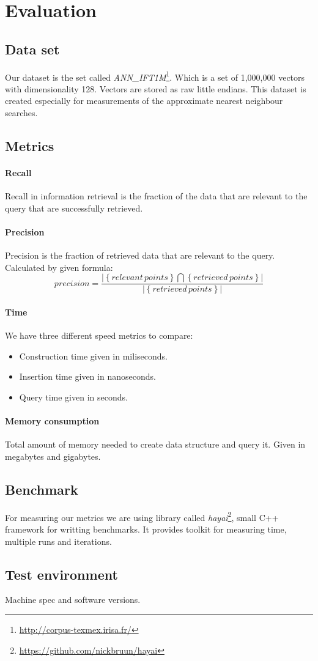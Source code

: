 \section{Evaluation}
 \subsection{Data set}
 Our dataset is the set called \textit{ANN\_IFT1M}\footnote{\url{http://corpus-texmex.irisa.fr/}}. Which is a set of 1,000,000 vectors
 with dimensionality 128. Vectors are stored as raw little endians.
 This dataset is created especially for measurements of the approximate nearest 
neighbour searches.  
 \subsection{Metrics}
 \paragraph{Recall}Recall in information retrieval is the fraction of the data that are relevant to the query that are successfully retrieved.
 \paragraph{Precision}Precision is the fraction of retrieved data that are relevant to the query. Calculated by given formula:
\begin{equation}
        precision = \frac{| \left\lbrace relevant\, points \right\rbrace \bigcap \left\lbrace retrieved\, points \right\rbrace | }{{| \left\lbrace retrieved\, points \right\rbrace |}}
\end{equation}
 \paragraph{Time}We have three different speed metrics to compare:
 \begin{itemize}
  \item Construction time given in miliseconds. 
  \item Insertion time given in nanoseconds.
  \item Query time given in seconds.
\end{itemize}
 \paragraph{Memory consumption} Total amount of memory needed to create data structure and query it. Given in megabytes and gigabytes.
 \subsection{Benchmark} For measuring our metrics we are using library called 
 \textit{hayai}\footnote{\url{https://github.com/nickbruun/hayai}}, small C++ framework for writting benchmarks. It provides toolkit for measuring time, multiple runs and iterations.
  \subsection{Test environment} 
  Machine spec and software versions. 
\label{evaluation}
